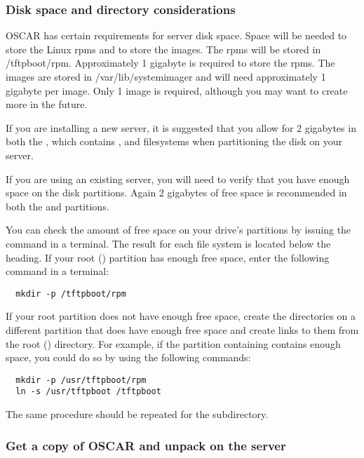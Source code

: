 \subsubsection{Disk space and directory considerations}

OSCAR has certain requirements for server disk space. Space will be
needed to store the Linux rpms and to store the images.
The rpms will be stored in /tftpboot/rpm. Approximately 1 gigabyte is required
to store the rpms. 
The images are stored in /var/lib/systemimager and will need approximately
1 gigabyte per image. Only 1 image is required, although you may want to create
more in the future. 

If you are installing a new server, it is suggested that you allow for 
2 gigabytes in both the \file{/}, which contains ,  
and  filesystems when partitioning the disk on your server.

If you are using an existing server, you will need to verify that you have 
enough space on the disk partitions. Again 2 gigabytes of free space
is recommended in both the \file{/} and  partitions.

You can check
the amount of free space on your drive's partitions by issuing the
command  in a terminal.  The result for each file system is
located below the  heading. If your root (\file{/})
partition has enough free space, enter the following command in a
terminal:

\begin{verbatim}
  mkdir -p /tftpboot/rpm
\end{verbatim}
  
If your root partition does not have enough free space, create the
directories on a different partition that does have enough free space
and create links to them from the root (\file{/}) directory.  For
example, if the partition containing  contains enough
space, you could do so by using the following commands:

\begin{verbatim}
  mkdir -p /usr/tftpboot/rpm
  ln -s /usr/tftpboot /tftpboot
\end{verbatim}

The same procedure should be repeated for the 
subdirectory.

    
\subsubsection{Get a copy of OSCAR and unpack on the server} 

